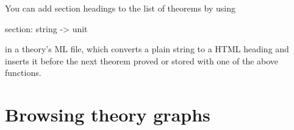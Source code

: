 You can add section headings to the list of theorems by using

\begin{ttbox}
section: string -> unit
\end{ttbox}

in a theory's ML file, which converts a plain string to a HTML
heading and inserts it before the next theorem proved or stored with
one of the above functions.


%
%
%
%
%


\section{Browsing theory graphs} \label{sec:browse}

